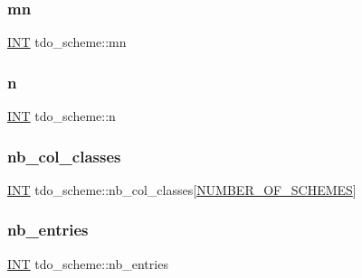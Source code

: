 \mbox{\label{classtdo__scheme_a6588af8463d3b4853438426c1c1bbb69}} 
\subsubsection{\texorpdfstring{mn}{mn}}
{\footnotesize\ttfamily \mbox{\hyperlink{galois_8h_a09fddde158a3a20bd2dcadb609de11dc}{I\+NT}} tdo\+\_\+scheme\+::mn}

\mbox{\label{classtdo__scheme_a964338258682e232c8f0c0d911063e7a}} 
\subsubsection{\texorpdfstring{n}{n}}
{\footnotesize\ttfamily \mbox{\hyperlink{galois_8h_a09fddde158a3a20bd2dcadb609de11dc}{I\+NT}} tdo\+\_\+scheme\+::n}

\mbox{\label{classtdo__scheme_a1e54869812e227b1a58c4b1ff05b51c9}} 
\subsubsection{\texorpdfstring{nb\+\_\+col\+\_\+classes}{nb\_col\_classes}}
{\footnotesize\ttfamily \mbox{\hyperlink{galois_8h_a09fddde158a3a20bd2dcadb609de11dc}{I\+NT}} tdo\+\_\+scheme\+::nb\+\_\+col\+\_\+classes\mbox{[}\mbox{\hyperlink{incidence_8h_a27f25725c4772efe473058135daeba55}{N\+U\+M\+B\+E\+R\+\_\+\+O\+F\+\_\+\+S\+C\+H\+E\+M\+ES}}\mbox{]}}

\mbox{\label{classtdo__scheme_a4b1aec8f3493f4abb10e7c03eeb48d60}} 
\subsubsection{\texorpdfstring{nb\+\_\+entries}{nb\_entries}}
{\footnotesize\ttfamily \mbox{\hyperlink{galois_8h_a09fddde158a3a20bd2dcadb609de11dc}{I\+NT}} tdo\+\_\+scheme\+::nb\+\_\+entries}

